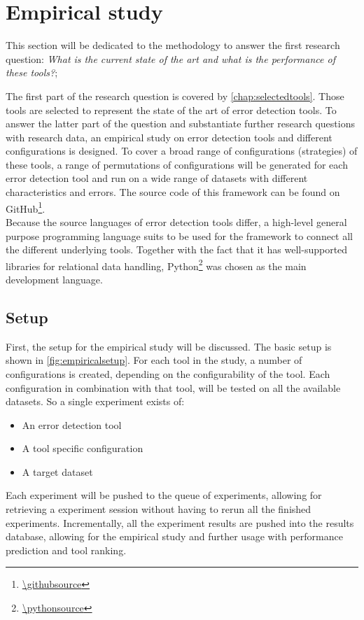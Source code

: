 \section{Empirical study}
\label{sec:empiricalstudy}
This section will be dedicated to the methodology to answer the first research question: \textit{What is the current state of the art and what is the performance of these tools?}; 

The first part of the research question is covered by \autoref{chap:selectedtools}. Those tools are selected to represent the state of the art of error detection tools.
To answer the latter part of the question and substantiate further research questions with research data, an empirical study on error detection tools and different configurations is designed. To cover a broad range of configurations (strategies) of these tools, a range of permutations of configurations will be generated for each error detection tool and run on a wide range of datasets with different characteristics and errors. The source code of this framework can be found on GitHub\footnote{\url{\githubsource}}.
~\\Because the source languages of error detection tools differ, a high-level general purpose programming language suits to be used for the framework to connect all the different underlying tools. Together with the fact that it has well-supported libraries for relational data handling, Python\footnote{\url{\pythonsource}} was chosen as the main development language.


\subsection{Setup}
\label{subsec:setup}
First, the setup for the empirical study will be discussed. The basic setup is shown in \autoref{fig:empiricalsetup}. For each tool in the study, a number of configurations is created, depending on the configurability of the tool. Each configuration in combination with that tool, will be tested on all the available datasets. So a single experiment exists of:
\begin{itemize}
    \item An error detection tool
    \item A tool specific configuration
    \item A target dataset
\end{itemize}

Each experiment will be pushed to the queue of experiments, allowing for retrieving a experiment session without having to rerun all the finished experiments. Incrementally, all the experiment results are pushed into the results database, allowing for the empirical study and further usage with performance prediction and tool ranking. 

